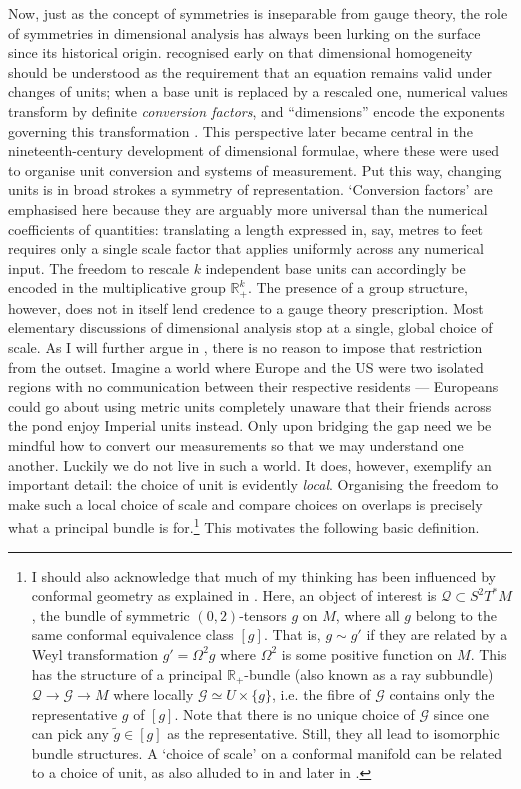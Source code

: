 \documentclass[12pt]{article}
\numberwithin{equation}{section}
\newcommand{\R}{\mathbb{R}}
\begin{document}
Now, just as the concept of symmetries is inseparable from gauge theory, the role of symmetries in dimensional analysis has always been lurking on the surface since its historical origin. \citet{Fourier1878} recognised early on that dimensional homogeneity should be understood as the requirement that an equation remains valid under changes of units; when a base unit is replaced by a rescaled one, numerical values transform by definite \emph{conversion factors}, and ``dimensions'' encode the exponents governing this transformation \citep{DeClark2017}. This perspective later became central in the nineteenth-century development of dimensional formulae, where these were used to organise unit conversion and systems of measurement. Put this way, changing units is in broad strokes a symmetry of representation. `Conversion factors' are emphasised here because they are arguably more universal than the numerical coefficients of quantities: translating a length expressed in, say, metres to feet requires only a single scale factor that applies uniformly across any numerical input. The freedom to rescale $k$ independent base units can accordingly be encoded in the multiplicative group $\R_+^k$. The presence of a group structure, however, does not in itself lend credence to a gauge theory prescription. Most elementary discussions of dimensional analysis stop at a single, global choice of scale. As I will further argue in , there is no reason to impose that restriction from the outset. Imagine a world where Europe and the US were two isolated regions with no communication between their respective residents --- Europeans could go about using metric units completely unaware that their friends across the pond enjoy Imperial units instead. Only upon bridging the gap need we be mindful how to convert our measurements so that we may understand one another. Luckily we do not live in such a world. It does, however, exemplify an important detail: the choice of unit is evidently \emph{local}. Organising the freedom to make such a local choice of scale and compare choices on overlaps is precisely what a principal bundle is for.\footnote{\label{footnote:conformalgeometry}I should also acknowledge that much of my thinking has been influenced by conformal geometry as explained in \citet{CurryGover2017}. Here, an object of interest is ${\mathcal{Q}\subset S^2T^*M}$, the bundle of symmetric $(0,2)$-tensors $g$ on $M$, where all $g$ belong to the same conformal equivalence class $[g]$. That is, $g\sim g'$ if they are related by a Weyl transformation $g'=\Omega^2 g$ where $\Omega^2$ is some positive function on $M$. This has the structure of a principal $\R_+$-bundle (also known as a ray subbundle) $\mathcal{Q}\to \mathcal{G}\to M$ where locally $\mathcal{G}\simeq U\times \{g\}$, i.e. the fibre of $\mathcal{G}$ contains only the representative $g$ of $[g]$. Note that there is no unique choice of $\mathcal{G}$ since one can pick any $\tilde{g}\in [g]$ as the representative. Still, they all lead to isomorphic bundle structures. A `choice of scale' on a conformal manifold can be related to a choice of unit, as also alluded to in \citet{KaramitsosMuntz2025} and later in .} This motivates the following basic definition.
\end{document}
